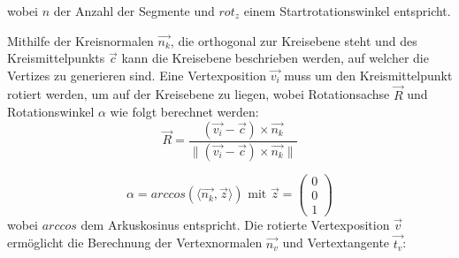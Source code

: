 wobei $n$ der Anzahl der Segmente und $rot_z$ einem Startrotationswinkel entspricht.

Mithilfe der Kreisnormalen $\overrightarrow{n_k}$, die orthogonal zur Kreisebene steht und des Kreismittelpunkts $\overrightarrow{c}$ kann die Kreisebene beschrieben werden, auf welcher die Vertizes zu generieren sind. Eine Vertexposition $\overrightarrow{v_i}$ muss um den Kreismittelpunkt rotiert werden, um auf der Kreisebene zu liegen, wobei Rotationsachse $\overrightarrow{R}$ und Rotationswinkel $\alpha$ wie folgt berechnet werden:
\begin{equation}
\overrightarrow{R} = \dfrac{(\overrightarrow{v_i} - \overrightarrow{c}) \times \overrightarrow{n_k}}{\lVert (\overrightarrow{v_i} - \overrightarrow{c}) \times \overrightarrow{n_k} \rVert}
\end{equation}

\begin{equation}
\alpha = arccos(\langle \overrightarrow{n_k}, \overrightarrow{z} \rangle) \text{ mit } \overrightarrow{z} = \begin{pmatrix}
0\\
0\\
1
\end{pmatrix}
\end{equation}
 wobei $arccos$ dem Arkuskosinus entspricht. \cite{RotationBetweenVectors:16} 
 Die rotierte Vertexposition $\overrightarrow{v}$ ermöglicht die Berechnung der Vertexnormalen $\overrightarrow{n_v}$ und Vertextangente $\overrightarrow{t_v}$:
 
